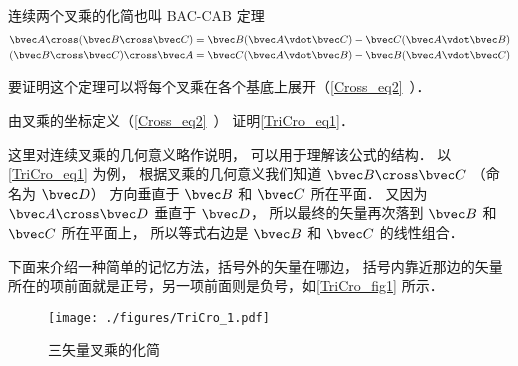 

连续两个叉乘的化简也叫 BAC-CAB 定理
\begin{gather}
\bvec A \cross (\bvec B \cross \bvec C) = \bvec B (\bvec A \vdot \bvec C) - \bvec C (\bvec A \vdot \bvec B)\label{TriCro_eq1}\\
(\bvec B \cross \bvec C) \cross \bvec A = \bvec C (\bvec A \vdot \bvec B) - \bvec B (\bvec A \vdot \bvec C)
\end{gather}

要证明这个定理可以将每个叉乘在各个基底上展开（\autoref{Cross_eq2}~）．

\begin{exercise}{}
由叉乘的坐标定义（\autoref{Cross_eq2}~） 证明\autoref{TriCro_eq1}．
\end{exercise} 

这里对连续叉乘的几何意义略作说明， 可以用于理解该公式的结构． 以\autoref{TriCro_eq1} 为例， 根据叉乘的几何意义我们知道 $\bvec B \cross \bvec C$ （命名为 $\bvec D$） 方向垂直于 $\bvec B$ 和 $\bvec C$ 所在平面． 又因为 $\bvec A \cross \bvec D$ 垂直于 $\bvec D$， 所以最终的矢量再次落到 $\bvec B$ 和 $\bvec C$ 所在平面上， 所以等式右边是 $\bvec B$ 和 $\bvec C$ 的线性组合．

下面来介绍一种简单的记忆方法，括号外的矢量在哪边， 括号内靠近那边的矢量所在的项前面就是正号，另一项前面则是负号，如\autoref{TriCro_fig1} 所示．

\begin{figure}[ht]
\centering
\texttt{[image: ./figures/TriCro\_1.pdf]}
\caption{三矢量叉乘的化简}\label{TriCro_fig1}
\end{figure}